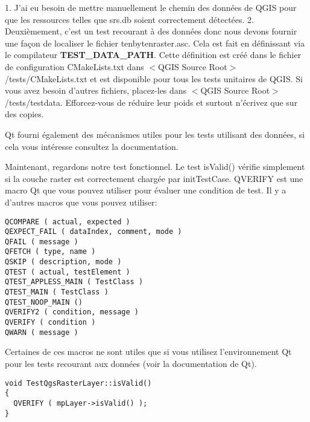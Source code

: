  1. J'ai eu besoin de mettre manuellement le chemin des donn\'ees de QGIS pour que les ressources telles que srs.db soient correctement d\'etect\'ees.
 2. Deuxi\`emement, c'est un test recourant \`a des donn\'ees donc nous devons fournir une fa\c{c}on de localiser le fichier tenbytenraster.asc. Cela est fait en d\'efinissant via le compilateur \textbf{TEST\_DATA\_PATH}. Cette d\'efinition est cr\'e\'e dans le fichier de configuration CMakeLists.txt dans $<$QGIS Source Root$>$/tests/CMakeLists.txt et est disponible pour tous les tests unitaires de QGIS. Si vous avez besoin d'autres fichiers, placez-les dans $<$QGIS Source Root$>$/tests/testdata. Efforcez-vous de r\'eduire leur poids et surtout n'\'ecrivez que sur des copies.

Qt fourni \'egalement des m\'ecanismes utiles pour les tests utilisant des donn\'ees, si cela vous int\'eresse consultez la documentation.

Maintenant, regardons notre test fonctionnel. Le test isValid() v\'erifie simplement si la couche raster est correctement charg\'ee par initTestCase. QVERIFY est une macro Qt que vous pouvez utiliser pour \'evaluer une condition de test. Il y a d'autres macros que vous pouvez utiliser:

\begin{verbatim}
QCOMPARE ( actual, expected )
QEXPECT_FAIL ( dataIndex, comment, mode )
QFAIL ( message )
QFETCH ( type, name )
QSKIP ( description, mode )
QTEST ( actual, testElement )
QTEST_APPLESS_MAIN ( TestClass )
QTEST_MAIN ( TestClass )
QTEST_NOOP_MAIN ()
QVERIFY2 ( condition, message )
QVERIFY ( condition )
QWARN ( message ) 
\end{verbatim}

Certaines de ces macros ne sont utiles que si vous utilisez l'environnement Qt pour les tests recourant aux donn\'ees (voir la documentation de Qt).

\begin{verbatim}
void TestQgsRasterLayer::isValid()
{
  QVERIFY ( mpLayer->isValid() );
}
\end{verbatim}

